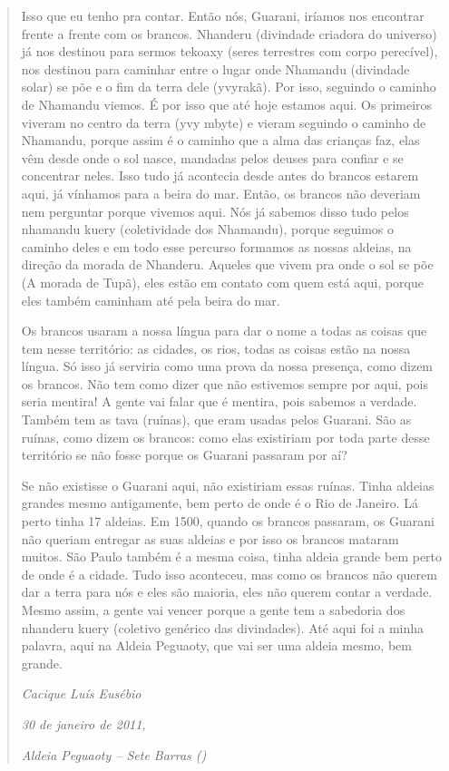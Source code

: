 \begin{quotation}
Isso que eu tenho pra contar. Então nós, Guarani, iríamos nos encontrar
frente a frente com os brancos. Nhanderu (divindade criadora do
universo) já nos destinou para sermos tekoaxy (seres terrestres com
corpo perecível), nos destinou para caminhar entre o lugar onde
Nhamandu (divindade solar) se põe e o fim da terra dele
(yvyrakã). Por isso, seguindo o caminho de Nhamandu viemos. É por isso
que até hoje estamos aqui. Os primeiros viveram no centro da terra (yvy
mbyte) e vieram seguindo o caminho de Nhamandu, porque assim é o caminho
que a alma das crianças faz, elas vêm desde onde o sol nasce, mandadas
pelos deuses para confiar e se concentrar neles. Isso tudo já acontecia
desde antes do brancos estarem aqui, já vínhamos para a beira do mar.
Então, os brancos não deveriam nem perguntar porque vivemos aqui. Nós
já sabemos disso tudo pelos nhamandu kuery (coletividade dos Nhamandu),
porque seguimos o caminho deles e em todo esse percurso formamos as
nossas aldeias, na direção da morada de Nhanderu. Aqueles que vivem pra
onde o sol se põe (A morada de Tupã), eles estão em contato com
quem está aqui, porque eles também caminham até pela beira do mar. 

Os brancos usaram a nossa língua para dar o nome a todas as coisas que
tem nesse território: as cidades, os rios, todas as coisas estão na
nossa língua. Só isso já serviria como uma prova da nossa presença,
como dizem os brancos. Não tem como dizer que não estivemos sempre por
aqui, pois seria mentira! A gente vai falar que é mentira, pois sabemos a
verdade. Também tem as tava (ruínas), que eram usadas pelos Guarani.
São as ruínas, como dizem os brancos: como elas existiriam por toda
parte desse território se não fosse porque os Guarani passaram por aí? 

Se não existisse o Guarani aqui, não existiriam essas ruínas. Tinha
aldeias grandes mesmo antigamente, bem perto de onde é o Rio de
Janeiro. Lá perto tinha 17 aldeias. Em 1500, quando os brancos
passaram, os Guarani não queriam entregar as suas aldeias e por isso os
brancos mataram muitos. São Paulo também é a mesma coisa, tinha aldeia
grande bem perto de onde é a cidade. Tudo isso aconteceu, mas como os
brancos não querem dar a terra para nós e eles são maioria, eles não
querem contar a verdade. Mesmo assim, a gente vai vencer porque a gente
tem a sabedoria dos nhanderu kuery (coletivo genérico das divindades).
Até aqui foi a minha palavra, aqui na Aldeia Peguaoty, que vai ser uma
aldeia mesmo, bem grande.
\medskip
\begin{flushright}
\emph{Cacique Luís Eusébio}

\emph{30 de janeiro de 2011,}

\emph{Aldeia Peguaoty – Sete Barras ()}

\end{flushright}
\end{quotation}

